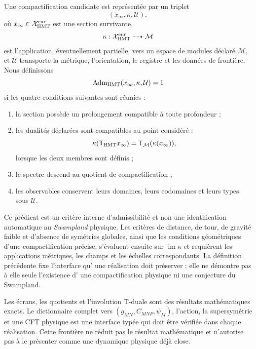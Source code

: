 \begin{definition}
\label{mdp4:def:admisibilidad-compactificacion-hmt-rev3}
Une compactification candidate est représentée par un triplet
\[
 (x_\infty,\kappa,\mathcal U),
\]
où \(x_\infty\in\mathcal X_{\rm HMT}^{\rm enr}\) est une section
survivante,
\[
 \kappa:\mathcal X_{\rm HMT}^{\rm enr}\dashrightarrow\mathcal M
\]
est l'application, éventuellement partielle, vers un espace de modules déclaré
\(\mathcal M\), et
\(\mathcal U\) transporte la métrique, l'orientation, le registre et les données de frontière.
Nous définissons
\[
 \operatorname{Adm}_{\rm HMT}(x_\infty,\kappa,\mathcal U)=1
\]
si les quatre conditions suivantes sont réunies :
\begin{enumerate}
 \item la section possède un prolongement compatible à toute profondeur ;
 \item les dualités déclarées sont compatibles au point considéré :
       \[
        \kappa(\mathsf T_{\rm HMT}x_\infty)
        =\mathsf T_{\mathcal M}(\kappa(x_\infty)),
       \]
       lorsque les deux membres sont définis ;
 \item le spectre descend au quotient de compactification ;
 \item les observables conservent leurs domaines, leurs codomaines et leurs types sous
       \(\mathcal U\).
\end{enumerate}
\end{definition}

Ce prédicat est un critère interne d'admissibilité et non une
identification automatique au \emph{Swampland} physique. Les critères de
distance, de tour, de gravité faible et d'absence de symétries globales, ainsi que
les conditions géométriques d'une compactification précise, s'évaluent
ensuite sur \(\operatorname{im}\kappa\) et requièrent les applications
métriques, les champs et les échelles correspondants. La définition précédente fixe l'interface qu'
une réalisation doit préserver ; elle ne démontre pas à elle seule l'existence d'
une compactification physique ni une conjecture du Swampland.

\begin{statusbox}[title={Portée de l'interface}]
Les écrans, les quotients et l'involution T-duale sont des résultats
mathématiques exacts. Le dictionnaire complet vers
\((g_{MN},C_{MNP},\psi_M)\), l'action, la supersymétrie et une CFT physique est
une interface typée qui doit être vérifiée dans chaque réalisation. Cette frontière
ne réduit pas le résultat mathématique et n'autorise pas à le présenter comme une dynamique
physique déjà close.
\end{statusbox}
